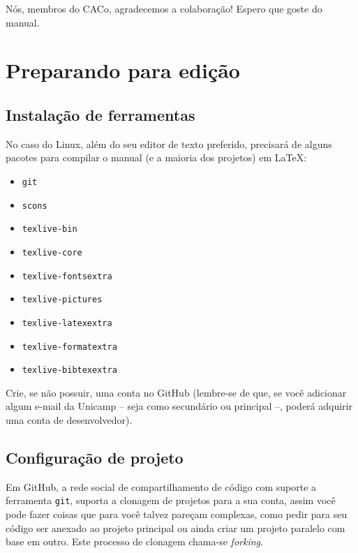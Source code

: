 \documentclass[a4paper,oneside,10pt]{memoir}
\begin{document}
Nós, membros do CACo, agradecemos a colaboração! Espero que goste do manual.

\mainmatter

\chapter{Preparando para edição}

\section{Instalação de ferramentas}

No caso do Linux, além do seu editor de texto preferido, precisará de alguns
pacotes para compilar o manual (e a maioria dos projetos) em \LaTeX:

\begin{multicols}{2}
\begin{itemize}[noitemsep] %
\item \texttt{git}
\item \texttt{scons}
\item \texttt{texlive-bin}
\item \texttt{texlive-core}
\item \texttt{texlive-fontsextra}
\item \texttt{texlive-pictures}
\item \texttt{texlive-latexextra}
\item \texttt{texlive-formatextra}
\item \texttt{texlive-bibtexextra}
\end{itemize}
\end{multicols}

Crie, se não possuir, uma conta no GitHub (lembre-se de que, se você adicionar
algum e-mail da Unicamp -- seja como secundário ou principal --, poderá
adquirir uma conta de desenvolvedor).

\section{Configuração de projeto}

Em GitHub, a rede social de compartilhamento de código com suporte a ferramenta
\texttt{git}, suporta a clonagem de projetos para a sua conta, assim você pode
fazer coisas que para você talvez pareçam complexas, como pedir para seu código
ser anexado ao projeto principal ou ainda criar um projeto paralelo com base em
outro. Este processo de clonagem chama-se \emph{forking}.
\end{document}
